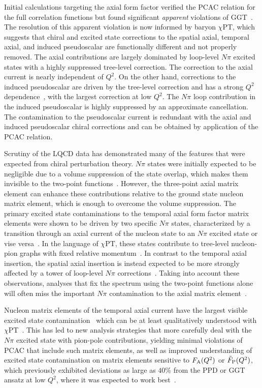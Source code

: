 \documentclass{ar-1col}
\begin{document}
Initial calculations targeting the axial form factor verified the PCAC relation
 for the full correlation functions but found significant \emph{apparent} violations
 of GGT~\cite{Ishikawa:2018rew,Gupta:2017dwj,Bali:2018qus}. The resolution of this apparent violation
 is now informed by baryon $\chi$PT, which suggests that chiral
 and excited state corrections to the spatial axial, temporal axial, and induced pseudoscalar
 are functionally different and not properly removed.
The axial contributions are largely dominated by loop-level $N\pi$ excited states
 with a highly suppressed tree-level correction.
The correction to the axial current is nearly independent of $Q^2$.
On the other hand, corrections to the induced pseudoscalar are
 driven by the tree-level correction and has
 a strong $Q^2$ dependence~\cite{Bar:2018xyi}, with the largest correction at low $Q^2$.
The $N\pi$ loop contribution in the induced pseudoscalar is highly suppressed by
 an approximate cancellation.
The contamination to the pseudoscalar current is redundant with the
 axial and induced pseudoscalar chiral corrections and can be obtained
 by application of the PCAC relation.

Scrutiny of the LQCD data has demonstrated many of the features
 that were expected from chiral perturbation theory.
$N\pi$ states were initially expected to be negligible due to a volume suppression
 of the state overlap, which makes them invisible to the two-point functions~\cite{Bar:2016uoj}.
However, the three-point axial matrix element can enhance these contributions relative
 to the ground state nucleon matrix element, which is enough to overcome the volume suppression.
The primary excited state contaminations to the temporal axial form factor matrix elements
 were shown to be driven by two specific $N\pi$ states,
 characterized by a transition through an axial current
 of the nucleon state to an $N\pi$ excited state or vise versa~\cite{Jang:2019vkm}.
In the language of $\chi$PT, these states contribute to tree-level nucleon-pion graphs with fixed relative momentum~\cite{Bar:2018xyi}.
In contrast to the temporal axial insertion, the spatial axial insertion
 is instead expected to be more strongly affected by a tower of loop-level
 $N\pi$ corrections~\cite{Bar:2018xyi}.
Taking into account these observations,
 analyses that fix the spectrum using the two-point functions alone
 will often miss the important $N\pi$ contamination to the
 axial matrix element~\cite{Jang:2019vkm,He:2021yvm}.


Nucleon matrix elements of the temporal axial current have the largest visible excited state contamination~\cite{Jang:2019vkm,RQCD:2019jai} which can be at least qualitatively understood with $\chi$PT~\cite{Bar:2018xyi}.
This has led to new analysis strategies that more carefully deal with the $N\pi$ excited state with pion-pole contributions, yielding minimal violations of PCAC that include such matrix elements, as well as improved understanding of excited state contamination on matrix elements sensitive to $F_{\rm A}(Q^2)$ or $\tilde{F}_{\rm P}(Q^2)$, which previously exhibited deviations as large as $40\%$ from the PPD or GGT
 ansatz at low $Q^2$, where it was expected to
 work best~\cite{Bali:2014nma,Gupta:2017dwj}.
\end{document}
